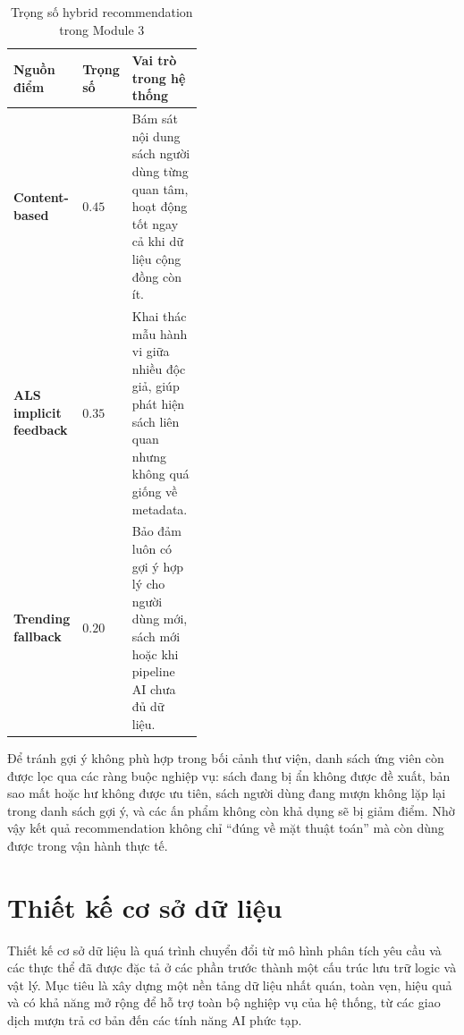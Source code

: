 \begin{table}[H]
\centering
\small
\renewcommand{\arraystretch}{1.15}
\setlength{\tabcolsep}{4pt}
\begin{tabularx}{\linewidth}{|>{\bfseries}p{0.24\linewidth}|>{\raggedright\arraybackslash}p{0.18\linewidth}|>{\raggedright\arraybackslash}X|}
\hline
\textbf{Nguồn điểm} & \textbf{Trọng số} & \textbf{Vai trò trong hệ thống} \\
\hline
Content-based & $0.45$ & Bám sát nội dung sách người dùng từng quan tâm, hoạt động tốt ngay cả khi dữ liệu cộng đồng còn ít. \\
\hline
ALS implicit feedback & $0.35$ & Khai thác mẫu hành vi giữa nhiều độc giả, giúp phát hiện sách liên quan nhưng không quá giống về metadata. \\
\hline
Trending fallback & $0.20$ & Bảo đảm luôn có gợi ý hợp lý cho người dùng mới, sách mới hoặc khi pipeline AI chưa đủ dữ liệu. \\
\hline
\end{tabularx}
\caption{Trọng số hybrid recommendation trong Module 3}
\label{tab:recommendation_weights}
\end{table}

Để tránh gợi ý không phù hợp trong bối cảnh thư viện, danh sách ứng viên còn được
lọc qua các ràng buộc nghiệp vụ: sách đang bị ẩn không được đề xuất, bản sao mất
hoặc hư không được ưu tiên, sách người dùng đang mượn không lặp lại trong danh
sách gợi ý, và các ấn phẩm không còn khả dụng sẽ bị giảm điểm. Nhờ vậy kết quả
recommendation không chỉ ``đúng về mặt thuật toán'' mà còn dùng được trong vận
hành thực tế.

\section{Thiết kế cơ sở dữ liệu}
Thiết kế cơ sở dữ liệu là quá trình chuyển đổi từ mô hình phân tích yêu cầu và các thực thể đã được đặc tả ở các phần trước thành một cấu trúc lưu trữ logic và vật lý. Mục tiêu là xây dựng một nền tảng dữ liệu nhất quán, toàn vẹn, hiệu quả và có khả năng mở rộng để hỗ trợ toàn bộ nghiệp vụ của hệ thống, từ các giao dịch mượn trả cơ bản đến các tính năng AI phức tạp.

